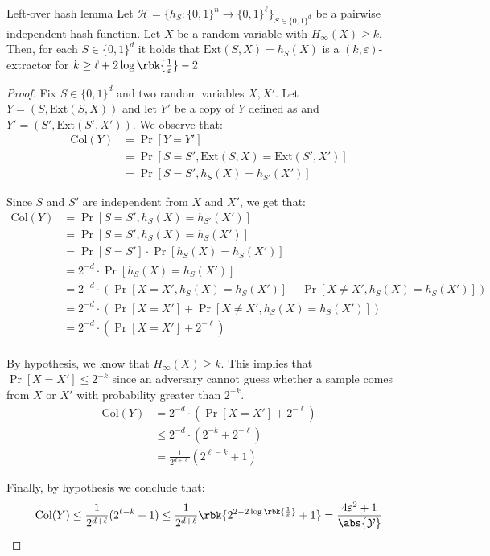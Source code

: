 \documentclass[a4paper, 12pt]{report}
\begin{document}
    \begin{framedlem}{Left-over hash lemma}
        Let $\mathcal{H} = \{h_S : \{0,1\}^n \to \{0,1\}^\ell\}_{S \in \{0,1\}^d}$ be a pairwise independent hash function. Let $X$ be a random variable with $H_{\infty}(X) \geq k$. Then, for each $S \in \{0,1\}^d$ it holds that $\mathrm{Ext}(S,X) = h_S(X)$ is a $(k,\varepsilon)$-extractor for $k \geq \ell + 2\log \rbk{\frac{1}{\varepsilon}} - 2$
    \end{framedlem}

    \begin{proof}
        Fix $S \in \{0,1\}^d$ and two random variables $X,X'$. Let $Y = (S, \mathrm{Ext}(S,X))$ and let $Y'$ be a copy of $Y$ defined as and $Y' = (S', \mathrm{Ext}(S',X'))$. We observe that:
        \[\begin{split}
            \mathrm{Col}(Y) &= \Pr[Y = Y'] \\
            &= \Pr[S = S', \mathrm{Ext}(S,X) = \mathrm{Ext}(S',X')] \\
            &= \Pr[S = S', h_S(X) = h_{S'}(X')]
        \end{split}\]

        Since $S$ and $S'$ are independent from $X$ and $X'$, we get that:
        \[\begin{split}
            \mathrm{Col}(Y) &= \Pr[S = S', h_S(X) = h_{S'}(X')] \\
            &= \Pr[S = S', h_S(X) = h_S(X')] \\
            &= \Pr[S = S'] \cdot \Pr[h_S(X) = h_{S}(X')] \\
            &= 2^{-d} \cdot \Pr[h_S(X) = h_{S}(X')] \\
            &= 2^{-d} \cdot (\Pr[X = X', h_S(X) = h_{S}(X')] + \Pr[X \neq X', h_S(X) = h_{S}(X')])\\
            &= 2^{-d} \cdot (\Pr[X = X'] + \Pr[X \neq X', h_S(X) = h_{S}(X')])\\
            &= 2^{-d} \cdot (\Pr[X = X'] + 2^{-\ell})\\
        \end{split}\]
        
        By hypothesis, we know that $H_{\infty}(X) \geq k$. This implies that $\Pr[X = X'] \leq 2^{-k}$ since an adversary cannot guess whether a sample comes from $X$ or $X'$ with probability greater than $2^{-k}$.
        \[\begin{split}
            \mathrm{Col}(Y) &= 2^{-d} \cdot (\Pr[X = X'] + 2^{-\ell})\\
            &\leq 2^{-d} \cdot (2^{-k} + 2^{-\ell})\\
            &= \frac{1}{2^{d+\ell}}(2^{\ell-k} + 1)
        \end{split}\]

        Finally, by hypothesis we conclude that:
        \[\mathrm{Col}(Y) \leq \frac{1}{2^{d+\ell}}(2^{\ell-k} + 1) \leq \frac{1}{2^{d+\ell}}\rbk{2^{2-2\log \rbk{\frac{1}{\varepsilon}}} + 1} = \frac{4\varepsilon^2 + 1}{\abs{\mathcal{Y}}}\]
    \end{proof}
\end{document}
